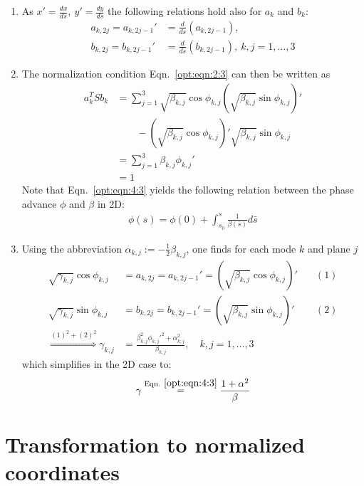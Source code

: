 \begin{enumerate}
\item As $x'=\frac{dx}{ds},\ y'=\frac{dy}{ds}$ the following relations hold also for $a_k$ and $b_k$:
\begin{align}
a_{k,2j}=a_{k,2j-1}'&=\frac{d}{ds}(a_{k,2j-1}), \\
b_{k,2j}=b_{k,2j-1}'&=\frac{d}{ds}(b_{k,2j-1}),\ k,j=1,\ldots,3
\end{align}
\item The normalization condition Eqn.~\ref{opt:eqn:2:3} can then be written as
\begin{align}
a_k^TSb_k&=\sum_{j=1}^3\sqrt{\beta_{k,j}}\cos{\phi_{k,j}}\left(\sqrt{\beta_{k,j}}\sin{\phi_{k,j}}\right)'\nonumber\\
& \qquad -\left(\sqrt{\beta_{k,j}}\cos{\phi_{k,j}}\right)'\sqrt{\beta_{k,j}}\sin{\phi_{k,j}}\nonumber\\
&=\sum_{j=1}^3\beta_{k,j}\phi_{k,j}'\nonumber\\
&=1 \label{opt:eqn:4:3}
\end{align}
Note that Eqn.~\ref{opt:eqn:4:3} yields the following relation between the phase advance $\phi$ and $\beta$ in 2D:
\begin{align}
\phi(s)=\phi(0)+\int_{s_0}^s\frac{1}{\beta(\bar s)}d\bar s
\end{align}
\item Using the abbreviation $\alpha_{k,j}:=-\frac{1}{2}\beta_{k,j}$, one finds for each mode $k$ and plane $j$
\begin{align}
\sqrt{\gamma_{k,j}}\cos{\phi_{k,j}}&=a_{k,2j}=a_{k,2j-1}'=(\sqrt{\beta_{k,j}}\cos{\phi_{k,j}})' &\quad (1)\nonumber\\
\sqrt{\gamma_{k,j}}\sin{\phi_{k,j}}&=b_{k,2j}=b_{k,2j-1}'=(\sqrt{\beta_{k,j}}\sin{\phi_{k,j}})' &\quad (2)\nonumber\\
\overset{(1)^2+(2)^2}{\Rightarrow} \gamma_{k,j}&=\frac{\beta_{k,j}^2\phi_{k,j}'^2+\alpha_{k,j}^2}{\beta_{k,j}}, \quad k,j=1,\ldots,3 &
\end{align}
which simplifies in the 2D case to:
\begin{align}
\gamma\overset{\rm Eqn.~\ref{opt:eqn:4:3}}{=}\frac{1+\alpha^2}{\beta}
\end{align}
\end{enumerate}

\section{Transformation to normalized coordinates}

